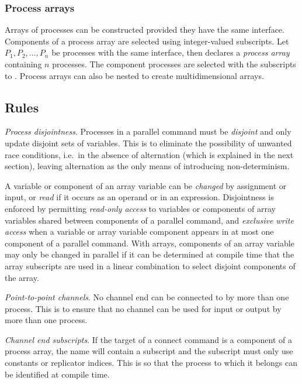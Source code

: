 \documentclass[11pt,a4paper,parskip=half-]{scrartcl}
\begin{document}
\subsubsection{Process arrays}

Arrays of processes can be constructed provided they
have the same interface. Components of a process array are selected using
integer-valued subscripts.
%
Let $P_1, P_2, \dots, P_n$ be processes with the same interface, then  declares a \emph{process array}
containing $n$ processes. The component processes are selected with the
subscripts  to . 
%
Process arrays can also be nested to create multidimensional arrays.


\subsection{Rules}

\ben[resume]

\label{sec:parallel-disjointness}
%
\item \emph{Process disjointness}.  Processes in a parallel command must be
  \emph{disjoint} and only update disjoint sets of variables. This is to
  eliminate the possibility of unwanted race conditions, i.e.\ in the absence
  of alternation (which is explained in the next section), leaving alternation
  as the only means of introducing non-determinism.

  A variable or component of an array variable can be \emph{changed} by
  assignment or input, or \emph{read} if it occurs as an operand or in an
  expression.
  Disjointness is enforced by permitting \emph{read-only access} to variables
  or components of array variables shared between components of a parallel
  command, and \emph{exclusive write access} when a variable or array variable
  component appears in at most one component of a parallel command.
  With arrays, components of an array variable may only be changed in parallel
  if it can be determined at compile time that the array subscripts are used in
  a linear combination to select disjoint components of the array.

\item \emph{Point-to-point channels}. No channel end can be connected to by
  more than one process. This is to ensure that no channel can be used for
  input or output by more than one process.

\item \emph{Channel end subscripts}.  If the target of a connect command is a
  component of a process array, the name will contain a subscript and the
  subscript must only use constants or replicator indices. This is so that the
  process to which it belongs can be identified at compile time.
\end{document}
